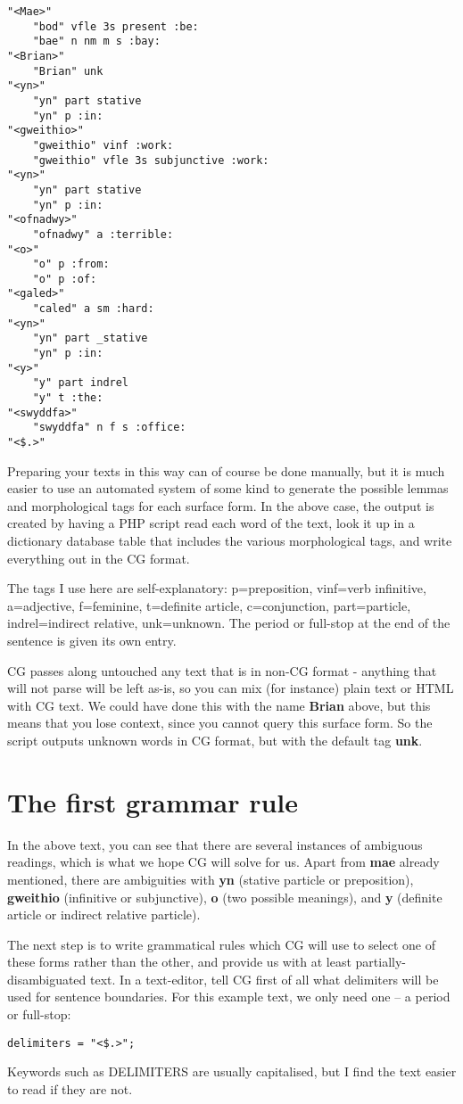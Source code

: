 \documentclass[a4paper,10pt]{article}
\begin{document}
\begin{Verbatim}[tabsize=4]
"<Mae>"
	"bod" vfle 3s present :be:
	"bae" n nm m s :bay:
"<Brian>"
	"Brian" unk
"<yn>"
	"yn" part stative
	"yn" p :in:
"<gweithio>"
	"gweithio" vinf :work:
	"gweithio" vfle 3s subjunctive :work:
"<yn>"
	"yn" part stative
	"yn" p :in:
"<ofnadwy>"
	"ofnadwy" a :terrible:
"<o>"
	"o" p :from:
	"o" p :of:
"<galed>"
	"caled" a sm :hard:
"<yn>"
	"yn" part _stative
	"yn" p :in:
"<y>"
	"y" part indrel
	"y" t :the:
"<swyddfa>"
	"swyddfa" n f s :office:
"<$.>"
\end{Verbatim}

Preparing your texts in this way can of course be done manually, but it is much easier to use an automated system of some kind to generate the possible lemmas and morphological tags for each surface form.  In the above case, the output is created by having a PHP script read each word of the text, look it up in a dictionary database table that includes the various morphological tags, and write everything out in the CG format.

The tags I use here are self-explanatory: p=preposition, vinf=verb infinitive, a=adjective, f=feminine, t=definite article, c=conjunction, part=particle, indrel\-=indirect relative, unk=unknown.  The period or full-stop at the end of the sentence is given its own entry.

CG passes along untouched any text that is in non-CG format - anything that will not parse will be left as-is, so you can mix (for instance) plain text or HTML with CG text.  We could have done this with the name \textbf{Brian} above, but this means that you lose context, since you cannot query this surface form.  So the script outputs unknown words in CG format, but with the default tag \textbf{unk}.

\section{The first grammar rule}

In the above text, you can see that there are several instances of ambiguous readings, which is what we hope CG will solve for us.  Apart from \textbf{mae} already mentioned, there are ambiguities with \textbf{yn} (stative particle or preposition), \textbf{gweithio} (infinitive or subjunctive), \textbf{o} (two possible meanings), and \textbf{y} (definite article or indirect relative particle).

The next step is to write grammatical rules which CG will use to select one of these forms rather than the other, and provide us with at least partially-disambiguated text.  In a text-editor, tell CG first of all what delimiters will be used for sentence boundaries.  For this example text, we only need one -- a period or full-stop:
\begin{Verbatim}[tabsize=4]
delimiters = "<$.>";
\end{Verbatim}
Keywords such as DELIMITERS are usually capitalised, but I find the text easier to read if they are not.
\end{document}
